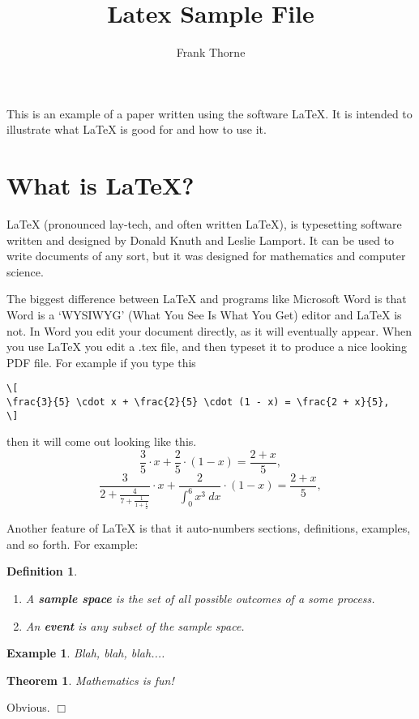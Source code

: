 \documentclass[12pt, leqno]{article}
\title{Latex Sample File}
\author{Frank Thorne}
\newenvironment{proof}{\noindent {\bf Proof:}}{$\Box$ \vspace{2 ex}}
\newtheorem{theorem}[proposition]{Theorem}
\newtheorem{example}[proposition]{Example}
\newtheorem{definition}[proposition]{Definition}
\begin{document}
\maketitle



This is an example of a paper written using the software LaTeX. It is intended to illustrate what LaTeX is good for and how to use it.


\section{What is LaTeX?}

LaTeX (pronounced lay-tech, and often written \LaTeX), is typesetting software written and designed by Donald Knuth and Leslie
Lamport. It can be used to write documents of any sort, but it was designed for mathematics and computer science.

The biggest difference between LaTeX and programs like Microsoft Word is that Word is a `WYSIWYG' (What You See Is What You Get)
editor and LaTeX is not. In Word you edit your document directly, as it will eventually appear. When you use LaTeX you edit a .tex file,
and then typeset it to produce a nice looking PDF file. For example if you type this
\begin{verbatim}
\[
\frac{3}{5} \cdot x + \frac{2}{5} \cdot (1 - x) = \frac{2 + x}{5},
\]
\end{verbatim}
then it will come out looking like this.
\[
\frac{3}{5} \cdot x + \frac{2}{5} \cdot (1 - x) = \frac{2 + x}{5},
\]
\[
\frac{3}{2 + \frac{4}{7 + \frac{1}{1 + \frac{1}{2}}}} \cdot x + \frac{2}{\int_0^6 x^3 \ dx} \cdot (1 - x) = \frac{2 + x}{5},
\]

Another feature of LaTeX is that it auto-numbers sections, definitions, examples, and so forth. For example:

\begin{definition}\label{foo}
\begin{enumerate}
\item
A {\bf sample space} is the set of all possible outcomes of a some process.
\item
An {\bf event} is any subset of the sample space.
\end{enumerate}
\end{definition}

\begin{example}\label{bar}
Blah, blah, blah....
\end{example}

\begin{theorem}\label{baz}
Mathematics is fun!
\end{theorem}
\begin{proof} Obvious. \end{proof}
\end{document}
